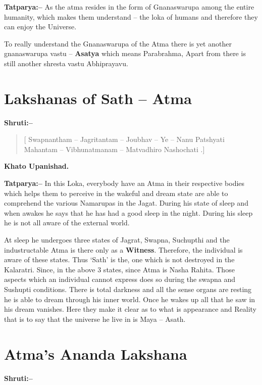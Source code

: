 \textbf{Tatparya:–} As the atma resides in the form of Gnanaswarupa among the entire humanity, which makes them understand – the loka of humans and therefore they can enjoy the Universe.

To really understand the Gnanaswarupa of the Atma there is yet another gnanaswarupa vastu – \textbf{Asatya} which means Parabrahma, Apart from there is still another shresta vastu Abhiprayavu.

\chapter{Lakshanas of Sath – Atma}

\textbf{Shruti:–}

\begin{verse}
[ Swapnantham – Jagritantam – Joubhav – Ye – Nanu Patshyati  Mahantam – Vibhunatmanam – Matvadhiro Nashochati .]
\end{verse}

\begin{flushright}
\textbf{Khato Upanishad.}
\end{flushright}

\textbf{Tatparya:–} In this Loka, everybody have an Atma in their respective bodies which helps them to perceive in the wakeful and dream state are able to comprehend the various Namarupas in the Jagat. During his state of sleep and when awakes he says that he has had a good sleep in the night. During his sleep he is not all aware of the external world.

At sleep he undergoes three states of Jagrat, Swapna, Suchupthi and the industructable Atma is there only as a \textbf{Witness}. Therefore, the individual is aware of these states. Thus ‘Sath’ is the, one which is not destroyed in the Kalaratri. Since, in the above 3 states, since Atma is Nasha Rahita. Those aspects which an individual cannot express does so during the swapna and Sushupti conditions. There is total darkness and all the sense organs are resting he is able to dream through his inner world. Once he wakes up all that he saw in his dream vanishes. Here they make it clear as to what is appearance and Reality that is to say that the universe he live in is Maya – Asath.

\chapter{Atma's Ananda Lakshana}

\textbf{Shruti:–}

